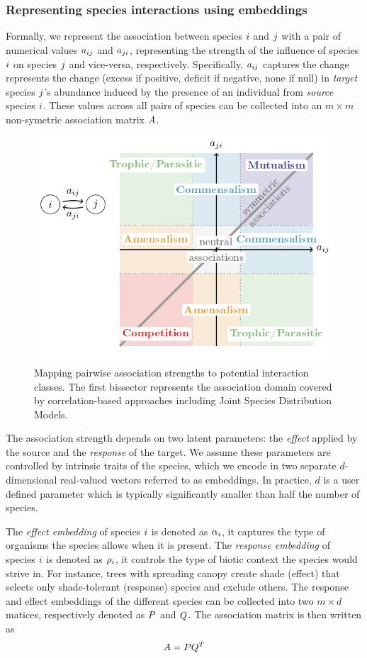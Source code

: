 \documentclass[10pt,a4paper]{article}
\newcommand{\inclPlt}[2]{\includegraphics[page=#1]{tikz_figures.pdf}}
\begin{document}
\subsubsection{Representing species interactions using embeddings}
Formally, we represent the association between species $i$ and
$j$ with a pair of numerical values $a_{ij}$ and
$a_{ji}$, representing the strength of the influence of species
$i$ on species $j$ and vice-versa, respectively. Specifically,
$a_{ij}$ captures the change represents the change (excess if
positive, deficit if negative, none if null) in \textit{target}
species $j$'s abundance induced by the presence of an individual
from \textit{source} species $i$.  These values across all pairs of
species can be collected into an $m \times m$ non-symetric association
matrix $A$.

\begin{figure}[bthp]
  \centering
  \inclPlt{1}{schema_types}
  \caption{Mapping pairwise association strengths to potential interaction classes. The first bissector represents the association domain covered by correlation-based approaches including Joint Species Distribution Models. }
  \label{assocdomain}
\end{figure}

The association strength depends on two latent parameters: the \textit{effect} applied by the source and the \textit{response} of the target. We assume these parameters are controlled by intrinsic traits of the species, which we encode in two separate $d$-dimensional real-valued vectors referred to as embeddings.
In practice, $d$ is a user defined parameter which is typically significantly smaller than half the number of species.

The \emph{effect embedding} of species $i$ is denoted as $\alpha_i$, it captures the type of organisms the species allows when it is present. The \emph{response embedding} of species $i$ is denoted as $\rho_i$, it controls the type of biotic context the species would strive in. For instance, trees with spreading canopy create shade (effect) that selects only shade-tolerant (response) species and exclude others.  
The response and effect embeddings of the different species can be collected into two $m\times d$ matices, respectively denoted as $P$ and $Q$.
The association matrix is then written as
\begin{equation*}
	A = PQ^{T}
\end{equation*}
\end{document}
